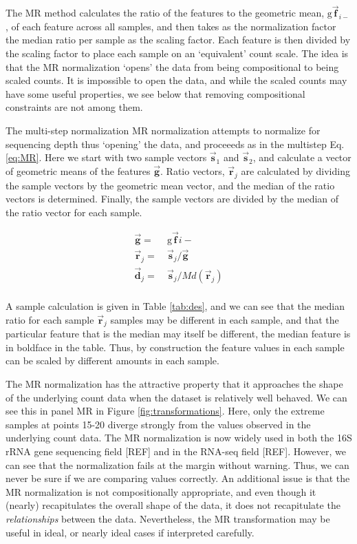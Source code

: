 \documentclass[onecolumn]{book}
\newcommand{\vect}[1]{\vec{\textbf{#1}}}
\theoremstyle{definition}
\theoremstyle{definition}
\theoremstyle{definition}
\theoremstyle{remark}
\begin{document}
The MR method calculates the ratio of the features to the geometric
mean, \(\mathrm{g}\vect{f}_{i-}\), of each feature across all samples,
and then takes as the normalization factor the median ratio per sample
as the scaling factor. Each feature is then divided by the scaling
factor to place each sample on an `equivalent' count scale. The idea is
that the MR normalization `opens' the data from being compositional to
being scaled counts. It is impossible to open the data, and while the
scaled counts may have some useful properties, we see below that
removing compositional constraints are not among them.

The multi-step normalization MR normalization attempts to normalize for
sequencing depth thus `opening' the data, and proceeeds as in the
multistep Eq. \ref{eq:MR}. Here we start with two sample vectors
\(\vec{\textbf{s}}_1\) and \(\vec{\textbf{s}}_2\), and calculate a
vector of geometric means of the features \(\vec{\textbf{g}}\). Ratio
vectors, \(\vec{\textbf{r}}_j\) are calculated by dividing the sample
vectors by the geometric mean vector, and the median of the ratio
vectors is determined. Finally, the sample vectors are divided by the
median of the ratio vector for each sample.

\begin{equation}
    \begin{aligned}
        \vec{\textbf{g}} = &\ \mathrm{g}\vect{f}{i-}\\
        \vec{\textbf{r}}_j = &\ \vec{\textbf{s}}_j / \vec{\textbf{g}}\\
        \vec{\textbf{d}}_j = &\ \vec{\textbf{s}}_j / Md(\vec{\textbf{r}}_j)\\
    \end{aligned}
\label{eq:MR}
\end{equation}

A sample calculation is given in Table \ref{tab:des}, and we can see
that the median ratio for each sample \(\vec{\textbf{r}}_j\) samples may
be different in each sample, and that the particular feature that is the
median may itself be different, the median feature is in boldface in the
table. Thus, by construction the feature values in each sample can be
scaled by different amounts in each sample.

The MR normalization has the attractive property that it approaches the
shape of the underlying count data when the dataset is relatively well
behaved. We can see this in panel MR in Figure
\ref{fig:transformations}. Here, only the extreme samples at points
15-20 diverge strongly from the values observed in the underlying count
data. The MR normalization is now widely used in both the 16S rRNA gene
sequencing field {[}REF{]} and in the RNA-seq field {[}REF{]}. However,
we can see that the normalization fails at the margin without warning.
Thus, we can never be sure if we are comparing values correctly. An
additional issue is that the MR normalization is not compositionally
appropriate, and even though it (nearly) recapitulates the overall shape
of the data, it does not recapitulate the \emph{relationships} between
the data. Nevertheless, the MR transformation may be useful in ideal, or
nearly ideal cases if interpreted carefully.
\end{document}
